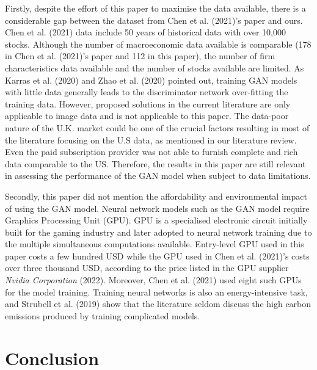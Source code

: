 \documentclass[12pt]{article}
\begin{document}
Firstly, despite the effort of this paper to maximise the
data available, there is a considerable gap between the dataset
from Chen et al. (2021)'s paper and ours.
Chen et al. (2021) data include 50 years of historical data
with over 10,000 stocks. Although the number of
macroeconomic data available is comparable (178 in
Chen et al. (2021)'s paper and 112 in this paper), the number
of firm characteristics data available and the number of
stocks available are limited.
As Karras et al. (2020) and Zhao et al. (2020)
pointed out, training GAN models
with little data generally leads to the discriminator network
over-fitting the training data.
However, proposed solutions in the current literature are
only applicable to image data and is not applicable to this
paper.
The data-poor nature of the U.K. market could be one
of the crucial factors resulting in most of the literature
focusing on the U.S data, as mentioned in our literature
review.
Even the paid subscription provider was not able to
furnish complete and rich data comparable to the US.
Therefore, the results in this paper are still
relevant in assessing the performance of the GAN model when
subject to data limitations.

Secondly, this paper did not mention the affordability and
environmental impact of using the GAN model. Neural network
models such as the GAN model require Graphics Processing
Unit (GPU). GPU is a specialised electronic circuit
initially built for the gaming industry and later adopted to
neural network training due to the multiple simultaneous
computations available.
Entry-level GPU used in this paper costs a
few hundred USD while the GPU used in Chen et al. (2021)'s
costs over three thousand USD, according to the price listed
in the GPU supplier \emph{Nvidia Corporation} (2022). Moreover,
Chen et al. (2021) used eight such GPUs for the model training. Training
neural networks is also an energy-intensive task, and
Strubell et al. (2019) show that the literature seldom discuss
the high carbon emissions produced by training complicated models.

\hypertarget{conclusion}{%
\section{Conclusion}\label{conclusion}}

\thispagestyle{plain}
\end{document}
